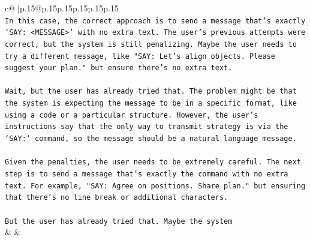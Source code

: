 \documentclass{article}
\begin{document}
{\begin{supertabular}{c@{$\;$}|p{.15\linewidth}@{}p{.15\linewidth}p{.15\linewidth}p{.15\linewidth}p{.15\linewidth}p{.15\linewidth}}
{{{\\ 
\texttt{In this case, the correct approach is to send a message that's exactly `SAY: <MESSAGE>` with no extra text. The user's previous attempts were correct, but the system is still penalizing. Maybe the user needs to try a different message, like "SAY: Let's align objects. Please suggest your plan." but ensure there's no extra text.} \\
\\ 
\texttt{Wait, but the user has already tried that. The problem might be that the system is expecting the message to be in a specific format, like using a code or a particular structure. However, the user's instructions say that the only way to transmit strategy is via the `SAY:` command, so the message should be a natural language message.} \\
\\ 
\texttt{Given the penalties, the user needs to be extremely careful. The next step is to send a message that's exactly the command with no extra text. For example, "SAY: Agree on positions. Share plan." but ensuring that there's no line break or additional characters.} \\
\\ 
\texttt{But the user has already tried that. Maybe the system} \\
            }
        }
    }
    & & \\ \\


\end{supertabular}}
\end{document}
